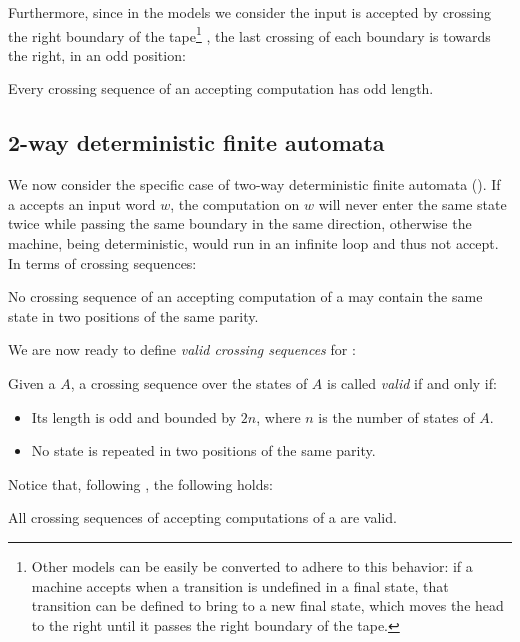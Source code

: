 Furthermore, since in the models we consider the input is accepted by crossing the right boundary of the tape\footnote{%
	Other models can be easily be converted to adhere to this behavior: if a machine accepts when a transition is undefined in a final state, that transition can be defined to bring to a new final state, which moves the head to the right until it passes the right boundary of the tape.}%
, the last crossing of each boundary is towards the right, \ie in an odd position:
\begin{fact}\label{fact:crossing-length}
	Every crossing sequence of an accepting computation has odd length.
\end{fact}


\subsection{2-way deterministic finite automata}
We now consider the specific case of two-way deterministic finite automata (\TDFAs).
If a \TDFA accepts an input word $w$, the computation on $w$ will never enter the same state twice while passing the same boundary in the same direction, otherwise the machine, being deterministic, would run in an infinite loop and thus not accept.
In terms of crossing sequences:
\begin{fact}\label{fact:crossing-2DFA-parity}
	No crossing sequence of an accepting computation of a \TDFA may contain the same state in two positions of the same parity.
\end{fact}

We are now ready to define \emph{valid crossing sequences} for \TDFAs:
\begin{defn}
	Given a \TDFA $A$, a crossing sequence over the states of $A$ is called \emph{valid} if and only if:
	\begin{itemize}
		\item Its length is odd and bounded by $2n$, where $n$ is the number of states of $A$.
		\item No state is repeated in two positions of the same parity.
	\end{itemize}
\end{defn}

Notice that, following , the following holds:
\begin{fact}
	All crossing sequences of accepting computations of a \TDFA are valid.
\end{fact}

